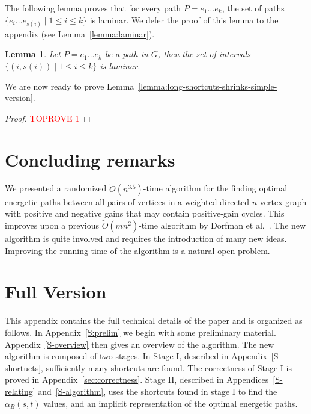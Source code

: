 \documentclass[11pt]{article}
\newtheorem{lemma}[theorem]{Lemma}
\begin{document}
The following lemma proves that for every path $P=e_1\ldots e_k$, the set of paths $\{e_i \ldots e_{s(i)}\mid 1\le i \le k\}$ is laminar. We defer the proof of this lemma to the appendix (see Lemma~\ref{lemma:laminar}).

\begin{lemma}\label{lemma:laminar-simple-version}
    Let $P=e_1 \ldots e_k$ be a path in $G$, then the set of intervals $\{(i, s(i)) \mid 1\le i \le k \}$ is laminar.
\end{lemma}

We are now ready to prove Lemma~\ref{lemma:long-shortcuts-shrinks-simple-version}.

\begin{proof}\textcolor{red}{TOPROVE 1}\end{proof}

\section{Concluding remarks}\label{S-concl}

We presented a randomized $\tilde{O}(n^{3.5})$-time algorithm for the finding optimal energetic paths between all-pairs of vertices in a weighted directed $n$-vertex graph with positive and negative gains that may contain positive-gain cycles. This improves upon a previous $\tilde{O}(mn^{2})$-time algorithm by Dorfman et al.~\cite{DorfmanKTZ23}. The new algorithm is quite involved and requires the introduction of many new ideas. Improving the running time of the algorithm is a natural open problem. 




\appendix

\section{Full Version}

This appendix contains the full technical details of the paper and is organized as follows. In Appendix~\ref{S:prelim} we begin with some preliminary material. Appendix~\ref{S-overview} then gives an overview of the algorithm. The new algorithm is composed of two stages. In Stage I, described in Appendix~\ref{S-shortucts}, sufficiently many shortcuts are found. The correctness of Stage I is proved in Appendix~\ref{sec:correctness}. Stage II, described in Appendices~\ref{S-relating} and~\ref{S-algorithm}, uses the shortcuts found in stage I to find the $\alpha_B(s,t)$ values, and an implicit representation of the optimal energetic paths.
\end{document}
